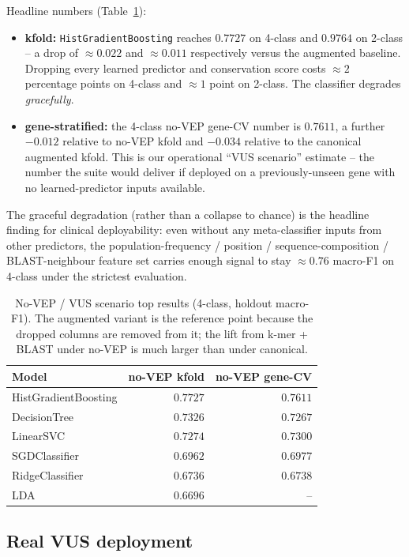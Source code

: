 \documentclass[11pt,a4paper]{article}
\begin{document}
Headline numbers (Table~\ref{tab:no-vep}):
\begin{itemize}[leftmargin=*]
 \item \textbf{kfold:} \texttt{HistGradientBoosting} reaches $0.7727$ on
 4-class and $0.9764$ on 2-class -- a drop of $\approx 0.022$
 and $\approx 0.011$ respectively versus the augmented baseline.
 Dropping every learned predictor and conservation score costs
 $\approx 2$ percentage points on 4-class and $\approx 1$ point on
 2-class. The classifier degrades \emph{gracefully}.
 \item \textbf{gene-stratified:} the 4-class no-VEP gene-CV number is
 $0.7611$, a further $-0.012$ relative to no-VEP kfold and $-0.034$
 relative to the canonical augmented kfold. This is our operational
 ``VUS scenario'' estimate -- the number the suite would deliver if
 deployed on a previously-unseen gene with no learned-predictor
 inputs available.
\end{itemize}
The graceful degradation (rather than a collapse to chance) is the headline
finding for clinical deployability: even without any meta-classifier
inputs from other predictors, the population-frequency / position /
sequence-composition / BLAST-neighbour feature set carries enough signal to
stay $\approx 0.76$ macro-F1 on 4-class under the strictest evaluation.

\begin{table}[H]
\centering
\caption{No-VEP / VUS scenario top results (4-class, holdout macro-F1).
The augmented variant is the reference point because the dropped columns
are removed from it; the lift from k-mer + BLAST under no-VEP is much
larger than under canonical.}
\label{tab:no-vep}
\small
\begin{tabular}{lrr}
\toprule
Model & no-VEP kfold & no-VEP gene-CV \\
\midrule
HistGradientBoosting & $0.7727$ & $0.7611$ \\
DecisionTree & $0.7326$ & $0.7267$ \\
LinearSVC & $0.7274$ & $0.7300$ \\
SGDClassifier & $0.6962$ & $0.6977$ \\
RidgeClassifier & $0.6736$ & $0.6738$ \\
LDA & $0.6696$ & -- \\
\bottomrule
\end{tabular}
\end{table}

\subsection{Real VUS deployment}
\label{sec:vus-deployment}
\end{document}
